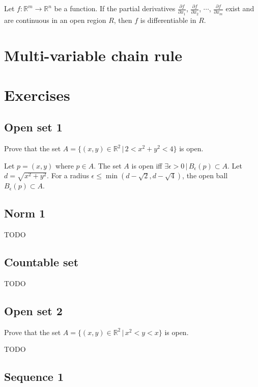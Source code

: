 \documentclass[a4paper]{article}
\begin{document}

Let \(f\colon {\mathbb{R}}^m \to {\mathbb{R}}^n\) be a function.
If the partial derivatives \(\frac{\partial f}{\partial x_1}\), \(\frac{\partial f}{\partial x_2}\),
\(\cdots\), \(\frac{\partial f}{\partial x_m}\) exist and are continuous in an open region \(R\), then \(f\) is differentiable in \(R\).

\section{Multi-variable chain rule}

\pagebreak

\section{Exercises}

\subsection{Open set 1}

Prove that the set \(A=\{(x,y) \in {\mathbb{R}}^2 \,|\, 2<x^2+y^2<4\}\)
is open.

Let \(p = (x,y)\) where \(p \in A\).
The set \(A\) is open iff \(\exists \epsilon > 0 \,|\, B_\epsilon(p) \subset A \).
Let \(d = \sqrt{x^2 + y^2}\). For a radius \(\epsilon \leq \min(d-\sqrt{2}, d-\sqrt{4})\),
the open ball \(B_\epsilon(p) \subset A\).

\subsection{Norm 1}

TODO

\subsection{Countable set}

TODO %

\subsection{Open set 2}

Prove that the set \(A=\{(x,y) \in {\mathbb{R}}^2 \,|\, x^2<y<x\}\)
is open.

TODO

\subsection{Sequence 1}
\end{document}
